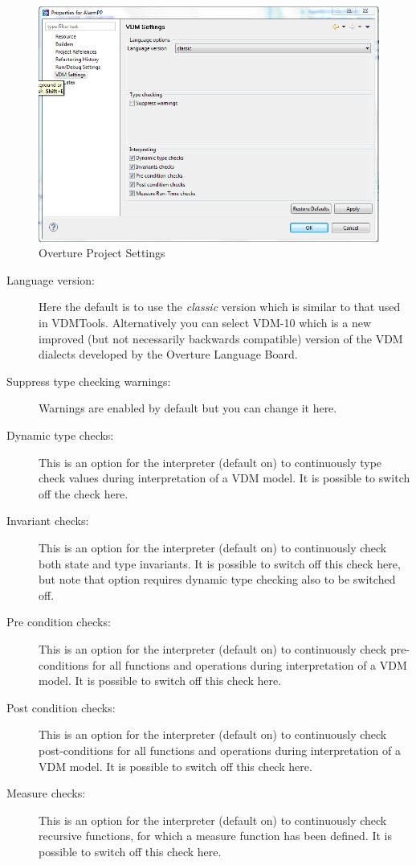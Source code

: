 \documentclass{overturerepchap}
\begin{document}
\begin{figure}[!hbt]
\begin{center}
  \includegraphics[width=\textwidth]{screendumps/projectsettings}
  \caption[Overture Project Settings]{Overture Project Settings}
  \label{fig:VDMSettings}
\end{center}
\end{figure}

\begin{description}
\item[Language version:] Here the default is to use the
  \emph{classic} version which is similar to that used in
  VDMTools. Alternatively you can select VDM-10 which
  is a new improved (but not necessarily backwards compatible) version of
  the VDM dialects developed by the Overture Language Board. 
\item[Suppress type checking warnings:] Warnings are enabled
  by default but you can change it here.
\item[Dynamic type checks:] This is an option for the interpreter (default on) 
  to continuously type check  values during interpretation of a VDM model.
  It is possible to switch off the check here.
\item[Invariant checks:] This is an option for the interpreter (default on) 
  to continuously check both state and type invariants.
  It is possible to switch off
  this check here, but note that option requires dynamic type
  checking also to be switched off.
\item[Pre condition checks:] This is an option for the interpreter (default on) 
  to continuously check pre-conditions for all functions and operations
  during interpretation of a VDM model. It is possible to switch off
  this check here.
\item[Post condition checks:] This is an option for the interpreter (default on) 
  to continuously check post-conditions for all functions and operations
  during interpretation of a VDM model. It is possible to switch off
  this check here.
\item[Measure checks:] This is an option for the interpreter (default
  on) to continuously check recursive functions, for which a
  measure function has been defined. It is possible to switch off this
  check here.
\end{description}
\end{document}
